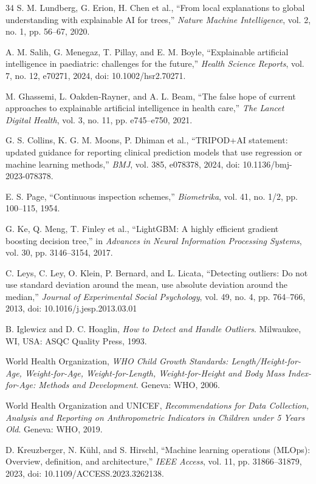 \begin{thebibliography}{34}
S. M. Lundberg, G. Erion, H. Chen et al., ``From local explanations to global understanding with explainable AI for trees,'' \emph{Nature Machine Intelligence}, vol. 2, no. 1, pp. 56--67, 2020.

A. M. Salih, G. Menegaz, T. Pillay, and E. M. Boyle, ``Explainable artificial intelligence in paediatric: challenges for the future,'' \emph{Health Science Reports}, vol. 7, no. 12, e70271, 2024, doi: 10.1002/hsr2.70271.

M. Ghassemi, L. Oakden-Rayner, and A. L. Beam, ``The false hope of current approaches to explainable artificial intelligence in health care,'' \emph{The Lancet Digital Health}, vol. 3, no. 11, pp. e745--e750, 2021.

G. S. Collins, K. G. M. Moons, P. Dhiman et al., ``TRIPOD+AI statement: updated guidance for reporting clinical prediction models that use regression or machine learning methods,'' \emph{BMJ}, vol. 385, e078378, 2024, doi: 10.1136/bmj-2023-078378.

E. S. Page, ``Continuous inspection schemes,'' \emph{Biometrika}, vol. 41, no. 1/2, pp. 100--115, 1954.

G. Ke, Q. Meng, T. Finley et al., ``LightGBM: A highly efficient gradient boosting decision tree,'' in \emph{Advances in Neural Information Processing Systems}, vol. 30, pp. 3146--3154, 2017.

C. Leys, C. Ley, O. Klein, P. Bernard, and L. Licata, ``Detecting outliers: Do not use standard deviation around the mean, use absolute deviation around the median,'' \emph{Journal of Experimental Social Psychology}, vol. 49, no. 4, pp. 764--766, 2013, doi: 10.1016/j.jesp.2013.03.01

B. Iglewicz and D. C. Hoaglin, \emph{How to Detect and Handle Outliers}. Milwaukee, WI, USA: ASQC Quality Press, 1993.

World Health Organization, \emph{WHO Child Growth Standards: Length/Height-for-Age, Weight-for-Age, Weight-for-Length, Weight-for-Height and Body Mass Index-for-Age: Methods and Development}. Geneva: WHO, 2006.

World Health Organization and UNICEF, \emph{Recommendations for Data Collection, Analysis and Reporting on Anthropometric Indicators in Children under 5 Years Old}. Geneva: WHO, 2019.

D. Kreuzberger, N. Kühl, and S. Hirschl, ``Machine learning operations (MLOps): Overview, definition, and architecture,'' \emph{IEEE Access}, vol. 11, pp. 31866--31879, 2023, doi: 10.1109/ACCESS.2023.3262138.


\end{thebibliography}
